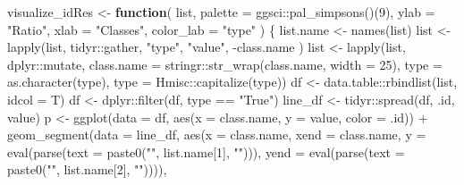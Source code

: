 \documentclass[
]{article}
\newenvironment{Shaded}{\begin{snugshade}}{\end{snugshade}}
\newcommand{\AttributeTok}[1]{\textcolor[rgb]{0.77,0.63,0.00}{#1}}
\newcommand{\ControlFlowTok}[1]{\textcolor[rgb]{0.13,0.29,0.53}{\textbf{#1}}}
\newcommand{\DecValTok}[1]{\textcolor[rgb]{0.00,0.00,0.81}{#1}}
\newcommand{\FunctionTok}[1]{\textcolor[rgb]{0.00,0.00,0.00}{#1}}
\newcommand{\NormalTok}[1]{#1}
\newcommand{\OtherTok}[1]{\textcolor[rgb]{0.56,0.35,0.01}{#1}}
\newcommand{\SpecialCharTok}[1]{\textcolor[rgb]{0.00,0.00,0.00}{#1}}
\newcommand{\StringTok}[1]{\textcolor[rgb]{0.31,0.60,0.02}{#1}}
\begin{document}
\begin{Shaded}
\begin{Highlighting}[]
\NormalTok{visualize\_idRes }\OtherTok{\textless{}{-}} 
  \ControlFlowTok{function}\NormalTok{(}
\NormalTok{    list,}
    \AttributeTok{palette =}\NormalTok{ ggsci}\SpecialCharTok{::}\FunctionTok{pal\_simpsons}\NormalTok{()(}\DecValTok{9}\NormalTok{),}
    \AttributeTok{ylab =} \StringTok{"Ratio"}\NormalTok{,}
    \AttributeTok{xlab =} \StringTok{"Classes"}\NormalTok{,}
    \AttributeTok{color\_lab =} \StringTok{"type"}
\NormalTok{  )}
\NormalTok{  \{}
\NormalTok{    list.name }\OtherTok{\textless{}{-}} \FunctionTok{names}\NormalTok{(list)}
\NormalTok{    list }\OtherTok{\textless{}{-}} \FunctionTok{lapply}\NormalTok{(list, tidyr}\SpecialCharTok{::}\NormalTok{gather,}
      \StringTok{"type"}\NormalTok{, }\StringTok{"value"}\NormalTok{, }\SpecialCharTok{{-}}\NormalTok{class.name}
\NormalTok{    )}
\NormalTok{    list }\OtherTok{\textless{}{-}} \FunctionTok{lapply}\NormalTok{(list, dplyr}\SpecialCharTok{::}\NormalTok{mutate,}
      \AttributeTok{class.name =}\NormalTok{ stringr}\SpecialCharTok{::}\FunctionTok{str\_wrap}\NormalTok{(class.name, }\AttributeTok{width =} \DecValTok{25}\NormalTok{),}
      \AttributeTok{type =} \FunctionTok{as.character}\NormalTok{(type),}
      \AttributeTok{type =}\NormalTok{ Hmisc}\SpecialCharTok{::}\FunctionTok{capitalize}\NormalTok{(type))}
\NormalTok{    df }\OtherTok{\textless{}{-}}\NormalTok{ data.table}\SpecialCharTok{::}\FunctionTok{rbindlist}\NormalTok{(list, }\AttributeTok{idcol =}\NormalTok{ T)}
\NormalTok{    df }\OtherTok{\textless{}{-}}\NormalTok{ dplyr}\SpecialCharTok{::}\FunctionTok{filter}\NormalTok{(df, type }\SpecialCharTok{==} \StringTok{"True"}\NormalTok{)}
\NormalTok{    line\_df }\OtherTok{\textless{}{-}}\NormalTok{ tidyr}\SpecialCharTok{::}\FunctionTok{spread}\NormalTok{(df, .id, value)}
\NormalTok{    p }\OtherTok{\textless{}{-}} \FunctionTok{ggplot}\NormalTok{(}\AttributeTok{data =}\NormalTok{ df, }\FunctionTok{aes}\NormalTok{(}\AttributeTok{x =}\NormalTok{ class.name, }\AttributeTok{y =}\NormalTok{ value, }\AttributeTok{color =}\NormalTok{ .id)) }\SpecialCharTok{+}
      \FunctionTok{geom\_segment}\NormalTok{(}\AttributeTok{data =}\NormalTok{ line\_df,}
        \FunctionTok{aes}\NormalTok{(}\AttributeTok{x =}\NormalTok{ class.name, }\AttributeTok{xend =}\NormalTok{ class.name,}
          \AttributeTok{y =} \FunctionTok{eval}\NormalTok{(}\FunctionTok{parse}\NormalTok{(}\AttributeTok{text =} \FunctionTok{paste0}\NormalTok{(}\StringTok{"\textasciigrave{}"}\NormalTok{, list.name[}\DecValTok{1}\NormalTok{], }\StringTok{"\textasciigrave{}"}\NormalTok{))),}
          \AttributeTok{yend =} \FunctionTok{eval}\NormalTok{(}\FunctionTok{parse}\NormalTok{(}\AttributeTok{text =} \FunctionTok{paste0}\NormalTok{(}\StringTok{"\textasciigrave{}"}\NormalTok{, list.name[}\DecValTok{2}\NormalTok{], }\StringTok{"\textasciigrave{}"}\NormalTok{)))),}

\end{Highlighting}
\end{Shaded}
\end{document}
